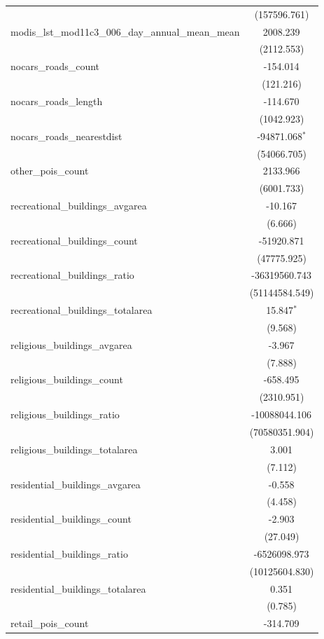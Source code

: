 \begin{table}[!htbp]
\begin{tabular}{@{\extracolsep{5pt}}lc}
  & (157596.761) \\
 modis_lst_mod11c3_006_day_annual_mean_mean & 2008.239$^{}$ \\
  & (2112.553) \\
 nocars_roads_count & -154.014$^{}$ \\
  & (121.216) \\
 nocars_roads_length & -114.670$^{}$ \\
  & (1042.923) \\
 nocars_roads_nearestdist & -94871.068$^{*}$ \\
  & (54066.705) \\
 other_pois_count & 2133.966$^{}$ \\
  & (6001.733) \\
 recreational_buildings_avgarea & -10.167$^{}$ \\
  & (6.666) \\
 recreational_buildings_count & -51920.871$^{}$ \\
  & (47775.925) \\
 recreational_buildings_ratio & -36319560.743$^{}$ \\
  & (51144584.549) \\
 recreational_buildings_totalarea & 15.847$^{*}$ \\
  & (9.568) \\
 religious_buildings_avgarea & -3.967$^{}$ \\
  & (7.888) \\
 religious_buildings_count & -658.495$^{}$ \\
  & (2310.951) \\
 religious_buildings_ratio & -10088044.106$^{}$ \\
  & (70580351.904) \\
 religious_buildings_totalarea & 3.001$^{}$ \\
  & (7.112) \\
 residential_buildings_avgarea & -0.558$^{}$ \\
  & (4.458) \\
 residential_buildings_count & -2.903$^{}$ \\
  & (27.049) \\
 residential_buildings_ratio & -6526098.973$^{}$ \\
  & (10125604.830) \\
 residential_buildings_totalarea & 0.351$^{}$ \\
  & (0.785) \\
 retail_pois_count & -314.709$^{}$ \\

\end{tabular}
\end{table}
